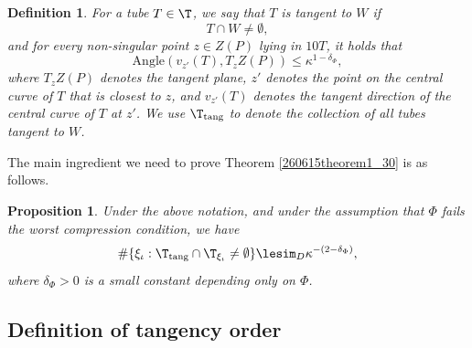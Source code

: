 \documentclass{article}
\numberwithin{equation}{section}
\theoremstyle{plain}
\newtheorem{proposition}[theorem]{Proposition}
\newtheorem{definition}[theorem]{Definition}
\begin{document}
\begin{definition}
For a tube $T\in \T$, we say that $T$ is tangent to $W$ if 
\begin{equation}
T\cap W\neq \emptyset, 
\end{equation}
and for every non-singular point $z\in Z(P)$ lying in $10 T$, it holds that 
\begin{equation}
\mathrm{Angle}(v_{z'}(T), T_z Z(P))\le \kappa^{1-\delta_{\Phi}},
\end{equation}
where $T_z Z(P)$ denotes the tangent plane,  $z'$ denotes the point on the central curve of $T$ that is closest to $z$, and $v_{z'}(T)$ denotes the tangent direction of the central curve of $T$ at $z'$. We use $\T_{\mathrm{tang}}$ to denote the collection of all tubes tangent to $W$. 
\end{definition}




The main ingredient we need to prove Theorem \ref{260615theorem1_30} is as follows. 

\begin{proposition}\label{260622prop10_2}
Under the above notation, and under the assumption that $\Phi$ fails the worst compression condition, we have 
\begin{equation}\label{260629e10_10}
\#
\{
\xi_{\iota}: \T_{\mathrm{tang}}\cap \T_{\xi_{\iota}}\neq \emptyset 
\}
\lesim_{D} 
\kappa^{-(2-\delta_{\Phi})},
\end{equation}
where $\delta_{\Phi}>0$ is a small constant depending only on $\Phi$. 
\end{proposition}






\subsection{Definition of tangency order}
\end{document}
